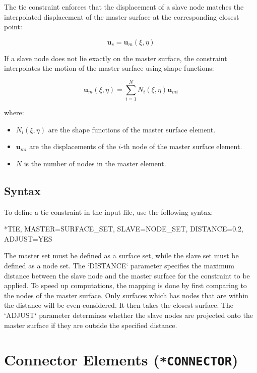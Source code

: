 The tie constraint enforces that the displacement of a slave node matches the interpolated displacement of the master surface at the corresponding closest point:

\[
\mathbf{u}_s = \mathbf{u}_m(\xi, \eta)
\]

If a slave node does not lie exactly on the master surface, the constraint interpolates the motion of the master surface using shape functions:

\[
\mathbf{u}_m(\xi, \eta) = \sum_{i=1}^{N} N_i(\xi, \eta) \mathbf{u}_{mi}
\]

where:
\begin{itemize}
    \item \( N_i(\xi, \eta) \) are the shape functions of the master surface element.
    \item \( \mathbf{u}_{mi} \) are the displacements of the \( i \)-th node of the master surface element.
    \item \( N \) is the number of nodes in the master element.
\end{itemize}

\subsection{Syntax}

To define a tie constraint in the input file, use the following syntax:

\begin{codeBlock}
*TIE, MASTER=SURFACE_SET, SLAVE=NODE_SET, DISTANCE=0.2, ADJUST=YES
\end{codeBlock}

The master set must be defined as a surface set, while the slave set must be defined as a node set.
The `DISTANCE` parameter specifies the maximum distance between the slave node and the master surface for the constraint to be applied.
To speed up computations, the mapping is done by first comparing to the nodes of the master surface. Only surfaces which has nodes that are within the distance will be even considered. It then takes the closest surface.
The `ADJUST` parameter determines whether the slave nodes are projected onto the master surface if they are outside the specified distance.




\section{Connector Elements (\texttt{*CONNECTOR})}

